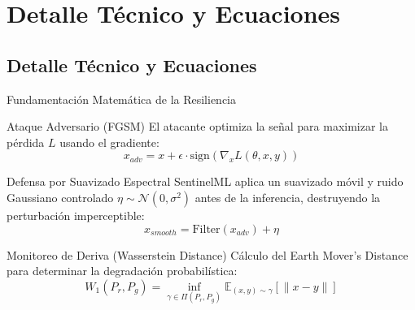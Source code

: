 \documentclass[10pt]{beamer}
\begin{document}
\section{Detalle Técnico y Ecuaciones}
\subsection{Detalle Técnico y Ecuaciones}

\begin{frame}{Fundamentación Matemática de la Resiliencia}
  \begin{block}{Ataque Adversario (FGSM)}
    El atacante optimiza la señal para maximizar la pérdida $L$ usando el gradiente:
    \begin{equation*}
      x_{adv} = x + \epsilon \cdot \text{sign}\left( \nabla_x L(\theta, x, y) \right)
    \end{equation*}
  \end{block}
  \begin{block}{Defensa por Suavizado Espectral}
    SentinelML aplica un suavizado móvil y ruido Gaussiano controlado $\eta \sim \mathcal{N}(0, \sigma^2)$ antes de la inferencia, destruyendo la perturbación imperceptible:
    \begin{equation*}
      x_{smooth} = \text{Filter}(x_{adv}) + \eta
    \end{equation*}
  \end{block}
  \begin{block}{Monitoreo de Deriva (Wasserstein Distance)}
    Cálculo del Earth Mover's Distance para determinar la degradación probabilística:
    \begin{equation*}
      W_1(P_r, P_g) = \inf_{\gamma \in \Pi(P_r, P_g)} \mathbb{E}_{(x,y)\sim \gamma}[\|x - y\|]
    \end{equation*}
  \end{block}
\end{frame}
\end{document}
